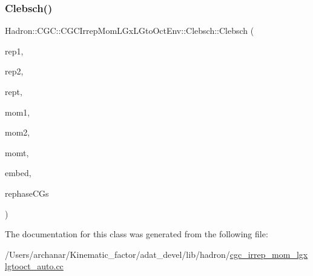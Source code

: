 \subsubsection{\texorpdfstring{Clebsch()}{Clebsch()}\hspace{0.1cm}{\footnotesize\ttfamily [2/2]}}
{\footnotesize\ttfamily Hadron\+::\+C\+G\+C\+::\+C\+G\+C\+Irrep\+Mom\+L\+Gx\+L\+Gto\+Oct\+Env\+::\+Clebsch\+::\+Clebsch (\begin{DoxyParamCaption}\item[{const std\+::string \&}]{rep1,  }\item[{const std\+::string \&}]{rep2,  }\item[{const std\+::string \&}]{rept,  }\item[{const Array\+Int \&}]{mom1,  }\item[{const Array\+Int \&}]{mom2,  }\item[{const Array\+Int \&}]{momt,  }\item[{int}]{embed,  }\item[{bool}]{rephase\+C\+Gs }\end{DoxyParamCaption})\hspace{0.3cm}{\ttfamily [inline]}}



The documentation for this class was generated from the following file\+:\begin{DoxyCompactItemize}
\item 
/\+Users/archanar/\+Kinematic\+\_\+factor/adat\+\_\+devel/lib/hadron/\mbox{\hyperlink{cgc__irrep__mom__lgxlgtooct__auto_8cc}{cgc\+\_\+irrep\+\_\+mom\+\_\+lgxlgtooct\+\_\+auto.\+cc}}\end{DoxyCompactItemize}
